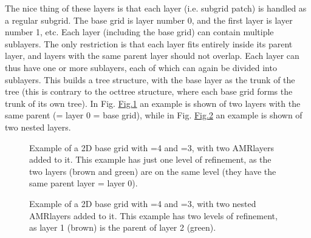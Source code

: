 \documentclass[letterpaper,10pt,english]{sphinxmanual}
\begin{document}
The nice thing of these layers is that each layer (i.e. subgrid patch) is
handled as a regular sub\sphinxhyphen{}grid. The base grid is layer number 0, and the first
layer is layer number 1, etc. Each layer (including the base grid) can contain
multiple sub\sphinxhyphen{}layers. The only restriction is that each layer fits entirely
inside its parent layer, and layers with the same parent layer should not
overlap. Each layer can thus have one or more sub\sphinxhyphen{}layers, each of which can
again be divided into sub\sphinxhyphen{}layers. This builds a tree structure, with the base
layer as the trunk of the tree (this is contrary to the oct\sphinxhyphen{}tree structure,
where each base grid  forms the trunk of its own tree). In
Fig. \hyperref[\detokenize{gridding:fig-twolayer-amr}]{Fig.\@ \ref{\detokenize{gridding:fig-twolayer-amr}}} an example is shown of two layers with the same
parent (= layer 0 = base grid), while in Fig. \hyperref[\detokenize{gridding:fig-nestedlayer-amr}]{Fig.\@ \ref{\detokenize{gridding:fig-nestedlayer-amr}}} an
example is shown of two nested layers.

\begin{figure}[htbp]
\centering
\capstart

\noindent{}
\caption{Example of a 2\sphinxhyphen{}D base grid with =4 and =3, with two
AMR\sphinxhyphen{}layers added to it. This example has just one level of refinement, as
the two layers (brown and green) are on the same level (they have the same
parent layer = layer 0).}\label{\detokenize{gridding:id5}}\label{\detokenize{gridding:fig-twolayer-amr}}\end{figure}

\begin{figure}[htbp]
\centering
\capstart

\noindent{}
\caption{Example of a 2\sphinxhyphen{}D base grid with =4 and =3, with two nested
AMR\sphinxhyphen{}layers added to it.  This example has two levels of refinement, as layer
1 (brown) is the parent of layer 2 (green).}\label{\detokenize{gridding:id6}}\label{\detokenize{gridding:fig-nestedlayer-amr}}\end{figure}
\end{document}
